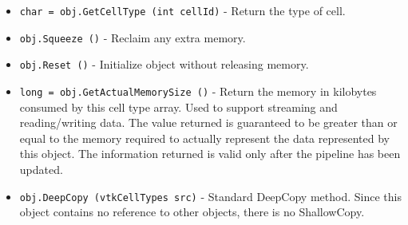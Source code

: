 \begin{itemize}
\item  \verb|char = obj.GetCellType (int cellId)| -  Return the type of cell.

\item  \verb|obj.Squeeze ()| -  Reclaim any extra memory.

\item  \verb|obj.Reset ()| -  Initialize object without releasing memory.

\item  \verb|long = obj.GetActualMemorySize ()| -  Return the memory in kilobytes consumed by this cell type array. 
 Used to support streaming and reading/writing data. The value 
 returned is guaranteed to be greater than or equal to the memory 
 required to actually represent the data represented by this object. 
 The information returned is valid only after the pipeline has 
 been updated.

\item  \verb|obj.DeepCopy (vtkCellTypes src)| -  Standard DeepCopy method.  Since this object contains no reference
 to other objects, there is no ShallowCopy.

\end{itemize}
